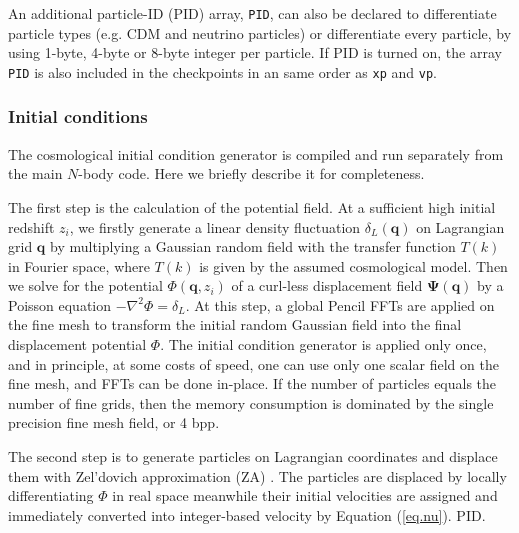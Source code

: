 \documentclass[10pt,twocolumn,preprint]{emulateapj}
\newcommand{\bs}{\boldsymbol}
\begin{document}
An additional particle-ID (PID) array, {\tt PID}, can also be declared to differentiate particle types (e.g. CDM and neutrino particles) or differentiate every particle, by using 1-byte, 4-byte or 8-byte integer per particle. If PID is turned on, the array {\tt PID} is also included in the checkpoints in an same order as {\tt xp} and {\tt vp}.

\subsubsection{Initial conditions}
The cosmological initial condition generator is compiled and run separately from the main $N$-body code. Here we briefly describe it for completeness.

The first step is the calculation of the potential field. At a sufficient high initial redshift $z_i$, we firstly generate a linear density fluctuation $\delta_L({\bs q})$ on Lagrangian grid ${\bs q}$ by multiplying a Gaussian random field with the transfer function $T(k)$ in Fourier space, where $T(k)$ is given by the assumed cosmological model. Then we solve for the potential ${\Phi({\bs q}, z_i)}$ of a curl-less displacement field ${\bs\Psi({\bs q})}$ by a Poisson equation $-\nabla^2\Phi=\delta_L$. At this step, a global Pencil FFTs are applied on the fine mesh to transform the initial random Gaussian field into the final displacement potential $\Phi$. The initial condition generator is applied only once, and in principle, at some costs of speed, one can use only one scalar field on the fine mesh, and FFTs can be done in-place. If the number of particles equals the number of fine grids, then the memory consumption is dominated by the single precision fine mesh field, or 4 bpp.

The second step is to generate particles on Lagrangian coordinates and displace them with Zel'dovich approximation (ZA) \citep{1970A&A.....5...84Z}. The particles are displaced by locally differentiating $\Phi$ in real space meanwhile their initial velocities are assigned and immediately converted into integer-based velocity by Equation (\ref{eq.nu}). PID.
\end{document}
